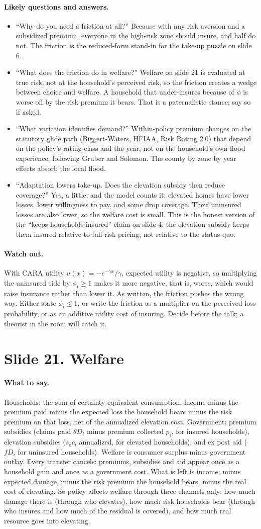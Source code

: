 \documentclass[11pt]{article}
\newcommand{\slide}[2]{\section*{Slide #1. #2}\addcontentsline{toc}{section}{Slide #1. #2}}
\newcommand{\say}{\paragraph{What to say.}}
\newcommand{\qa}{\paragraph{Likely questions and answers.}}
\newcommand{\watch}{\paragraph{Watch out.}}
\begin{document}
\qa
\begin{itemize}
\item ``Why do you need a friction at all?'' Because with any risk aversion and a subsidized premium, everyone in the high-risk zone should insure, and half do not. The friction is the reduced-form stand-in for the take-up puzzle on slide 6.
\item ``What does the friction do in welfare?'' Welfare on slide 21 is evaluated at true risk, not at the household's perceived risk, so the friction creates a wedge between choice and welfare. A household that under-insures because of $\phi$ is worse off by the risk premium it bears. That is a paternalistic stance; say so if asked.
\item ``What variation identifies demand?'' Within-policy premium changes on the statutory glide path (Biggert-Waters, HFIAA, Risk Rating 2.0) that depend on the policy's rating class and the year, not on the household's own flood experience, following Gruber and Solomon. The county by zone by year effects absorb the local flood.
\item ``Adaptation lowers take-up. Does the elevation subsidy then reduce coverage?'' Yes, a little, and the model counts it: elevated homes have lower losses, lower willingness to pay, and some drop coverage. Their uninsured losses are also lower, so the welfare cost is small. This is the honest version of the ``keeps households insured'' claim on slide 4: the elevation subsidy keeps them insured relative to full-risk pricing, not relative to the status quo.
\end{itemize}

\watch With CARA utility $u(x) = -e^{-\gamma x}/\gamma$, expected utility is negative, so multiplying the uninsured side by $\phi_i \ge 1$ makes it more negative, that is, worse, which would raise insurance rather than lower it. As written, the friction pushes the wrong way. Either state $\phi_i \le 1$, or write the friction as a multiplier on the perceived loss probability, or as an additive utility cost of insuring. Decide before the talk; a theorist in the room will catch it.

\slide{21}{Welfare}
\say Households: the sum of certainty-equivalent consumption, income minus the premium paid minus the expected loss the household bears minus the risk premium on that loss, net of the annualized elevation cost. Government: premium subsidies (claims paid $\theta D_i$ minus premium collected $p_i$, for insured households), elevation subsidies ($s_e c_i$ annualized, for elevated households), and ex post aid ($f D_i$ for uninsured households). Welfare is consumer surplus minus government outlay. Every transfer cancels: premiums, subsidies and aid appear once as a household gain and once as a government cost. What is left is income, minus expected damage, minus the risk premium the household bears, minus the real cost of elevating. So policy affects welfare through three channels only: how much damage there is (through who elevates), how much risk households bear (through who insures and how much of the residual is covered), and how much real resource goes into elevating.
\end{document}
